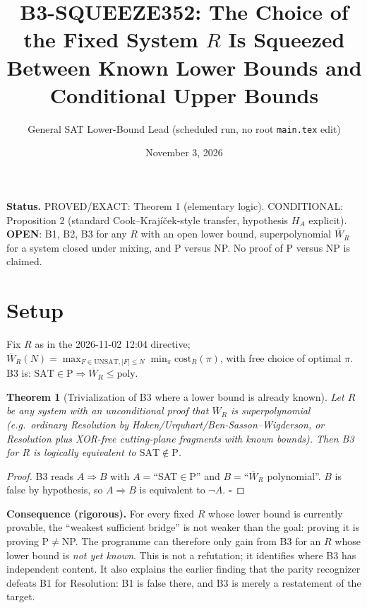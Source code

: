 \documentclass[11pt]{article}
\title{B3-SQUEEZE352: The Choice of the Fixed System $R$ Is Squeezed Between Known Lower Bounds and Conditional Upper Bounds}
\author{General SAT Lower-Bound Lead (scheduled run, no root \texttt{main.tex} edit)}
\date{November 3, 2026}
\newtheorem{theorem}{Theorem}
\begin{document}
\maketitle
\noindent\textbf{Status.} PROVED/EXACT: Theorem 1 (elementary logic). CONDITIONAL: Proposition 2 (standard Cook--Krajíček-style transfer, hypothesis $H_A$ explicit). \textbf{OPEN}: B1, B2, B3 for any $R$ with an open lower bound, superpolynomial $\overline W_R$ for a system closed under mixing, and P versus NP. No proof of P versus NP is claimed.

\section*{Setup}
Fix $R$ as in the 2026-11-02 12:04 directive; $\overline W_R(N)=\max_{F\in\mathrm{UNSAT},|F|\le N}\min_{\pi}\mathrm{cost}_R(\pi)$, with free choice of optimal $\pi$. B3 is: $\mathrm{SAT}\in\mathrm P\Rightarrow\overline W_R\le \mathrm{poly}$.

\begin{theorem}[Trivialization of B3 where a lower bound is already known]
Let $R$ be any system with an unconditional proof that $\overline W_R$ is superpolynomial (e.g.\ ordinary Resolution by Haken/Urquhart/Ben-Sasson--Wigderson, or Resolution plus XOR-free cutting-plane fragments with known bounds). Then B3 for $R$ is logically equivalent to $\mathrm{SAT}\notin\mathrm P$.
\end{theorem}
\begin{proof} B3 reads $A\Rightarrow B$ with $A=$``SAT$\in$P'' and $B=$``$\overline W_R$ polynomial''. $B$ is false by hypothesis, so $A\Rightarrow B$ is equivalent to $\neg A$. \qquad$\square$
\end{proof}
\noindent\textbf{Consequence (rigorous).} For every fixed $R$ whose lower bound is currently provable, the ``weakest sufficient bridge'' is not weaker than the goal: proving it is proving P$\ne$NP. The programme can therefore only gain from B3 for an $R$ whose lower bound is \emph{not yet known}. This is not a refutation; it identifies where B3 has independent content. It also explains the earlier finding that the parity recognizer defeats B1 for Resolution: B1 is false there, and B3 is merely a restatement of the target.
\end{document}
